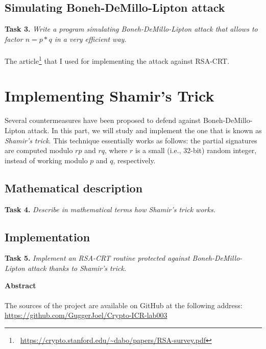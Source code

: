 \documentclass[a4paper]{report}
\begin{document}
\section{Simulating Boneh-DeMillo-Lipton attack}
\textbf{Task 3.} \textit{Write a program simulating Boneh-DeMillo-Lipton attack that allows to factor $n = p*q$ in a very efficient way.}
\\ \\
The article\footnote{\ \href{https://crypto.stanford.edu/~dabo/papers/RSA-survey.pdf}{\url{https://crypto.stanford.edu/~dabo/papers/RSA-survey.pdf}}} that I used for implementing the attack against RSA-CRT.



\chapter{Implementing Shamir’s Trick}
Several countermeasures have been proposed to defend against Boneh-DeMillo-Lipton attack. In this part, we will study and implement the one that is known as \textit{Shamir’s trick}. This technique essentially works as follows: the partial signatures are computed modulo $rp$ and $rq$, where $r$ is a small (i.e., 32-bit) random integer, instead of working modulo $p$ and $q$, respectively.

\section{Mathematical description}
\textbf{Task 4.} \textit{Describe in mathematical terms how Shamir’s trick works.}

\section{Implementation}
\textbf{Task 5.} \textit{Implement an RSA-CRT routine protected against Boneh-DeMillo-Lipton attack thanks to Shamir’s trick.}


\newpage
\vspace*{6 cm}
\begin{center}
\textbf{Abstract} \\
\ \\
The sources of the project are available on GitHub at the following address: \\
\href{https://github.com/GuggerJoel/Crypto-ICR-lab003}{\url{https://github.com/GuggerJoel/Crypto-ICR-lab003}}
\end{center}
\end{document}
